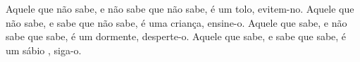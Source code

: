 
\begin{epigrafe}%
    Aquele que não sabe, e não sabe que não sabe, é um tolo, evitem-no. Aquele que não sabe, e sabe que não sabe, é uma criança, ensine-o. Aquele que sabe, e não sabe que sabe, é um dormente, desperte-o. Aquele que sabe, e sabe que sabe, é um sábio , siga-o.
\end{epigrafe}
